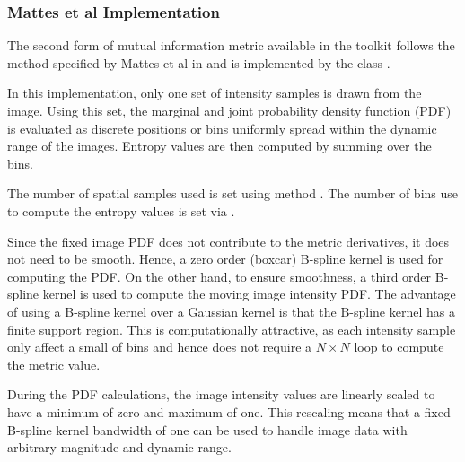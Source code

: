 \subsubsection{Mattes et al Implementation}
The second form of mutual information metric available in the toolkit follows
the method specified by Mattes et al in \cite{Mattes2001} and is implemented by
the class  .

In this implementation, only one set of intensity samples is drawn from the image.
Using this set, the marginal and joint probability density function (PDF)
is evaluated as discrete positions or bins uniformly spread within the dynamic range
of the images. Entropy values are then computed by summing over the bins.


The number of spatial samples used is set using method 
. The number of bins use to compute
the entropy values is set via .

Since the fixed image PDF does not contribute to the metric derivatives, it does
not need to be smooth. Hence, a zero order (boxcar) B-spline kernel is
used for computing the PDF. On the other hand, to ensure smoothness,
a third order B-spline kernel is used to compute the moving image
intensity PDF. The advantage of using a B-spline kernel over a Gaussian kernel
is that the B-spline kernel has a finite support region. This is 
computationally attractive, as each intensity sample only affect a small
of bins and hence does not require a $N \times N$ loop to compute the
metric value.

During the PDF calculations, the image intensity values are linearly scaled to have
a minimum of zero and maximum of one. This rescaling means that a fixed
B-spline kernel bandwidth of one can be used to handle image data 
with arbitrary magnitude and dynamic range.
